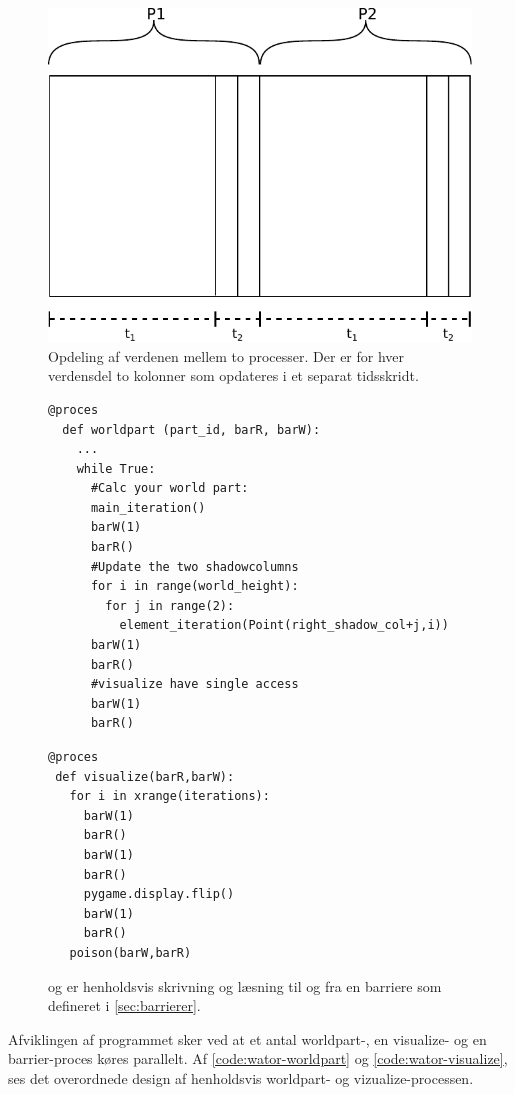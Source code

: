 \begin{figure}
 \begin{center}
  \includegraphics[scale=0.75]{images/wator}
  \caption{Opdeling af verdenen mellem to processer. Der er for hver verdensdel 
  to kolonner som opdateres i et separat tidsskridt.}
  \label{fig:wator}
  \end{center}
\end{figure}


\begin{figure}[hbtp]
\begin{minipage}{\linewidth}
\begin{lstlisting}[label=code:wator-worldpart,caption=Uddrag af processen 
  \code{worldpart} i Wator]
  @proces
  def worldpart (part_id, barR, barW):  
    ...  
    while True:
      #Calc your world part:
      main_iteration()
      barW(1)
      barR()
      #Update the two shadowcolumns
      for i in range(world_height):
        for j in range(2):
          element_iteration(Point(right_shadow_col+j,i))
      barW(1)
      barR()
      #visualize have single access
      barW(1)
      barR()
\end{lstlisting}

\begin{lstlisting}[label=code:wator-visualize,caption=Processen 
  \emph{visualize} i Wator]
@proces
 def visualize(barR,barW):
   for i in xrange(iterations):
     barW(1)
     barR()
     barW(1)
     barR()
     pygame.display.flip()
     barW(1)
     barR()
   poison(barW,barR)
\end{lstlisting}

\end{minipage}
\caption[test]{ og  er henholdsvis skrivning og læsning til og 
fra en barriere som defineret i \cref{sec:barrierer}.}
\end{figure}
Afviklingen af programmet sker ved at et antal worldpart-, en 
visualize- og en barrier-proces køres parallelt. Af 
\autoref{code:wator-worldpart} og \cref{code:wator-visualize}, ses det 
overordnede design af henholdsvis worldpart- og 
vizualize-processen.  
